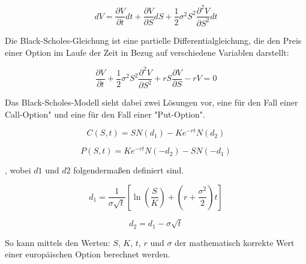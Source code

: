 \begin{equation}
	dV = \frac{\partial{V}}{\partial{t}} dt + \frac{\partial{V}}{\partial{S}} dS+ \frac{1}{2} \sigma^2 S^2 \frac{\partial^2{V}}{\partial{S^2}} dt
\end{equation}





Die Black-Scholes-Gleichung ist eine partielle Differentialgleichung, die den Preis einer Option im Laufe der Zeit in Bezug auf verschiedene Variablen darstellt:


\begin{equation}
	\frac{\partial V}{\partial t} + \frac{1}{2} \sigma^2 S^2 \frac{\partial^2 V}{\partial S^2} + rS \frac{\partial V}{\partial S} - rV = 0
\end{equation}

Das Black-Scholes-Modell sieht dabei zwei Lösungen vor, eine für den Fall einer Call-Option" und eine für den Fall einer "Put-Option".

\begin{equation}
	C(S, t) = SN(d_1) - Ke^{-rt}N(d_2)
\end{equation}

\begin{equation}
	P(S, t) = Ke^{-rt}N(-d_2) - SN(-d_1)
\end{equation}

, wobei $ d1 $ und $ d2 $ folgendermaßen definiert sind.

\begin{equation}
	d_1 = \frac{1}{\sigma \sqrt{t}} \left[\ln\left(\frac{S}{K}\right) + \left(r + \frac{\sigma^2}{2}\right)t\right]
\end{equation}

\begin{equation}
	d_2 = d_1 - \sigma \sqrt{t}
\end{equation}

So kann mittels den Werten: $ S $, $ K $, $ t $, $ r $ und $ \sigma $ der mathematisch korrekte Wert einer europäischen Option berechnet werden. 
